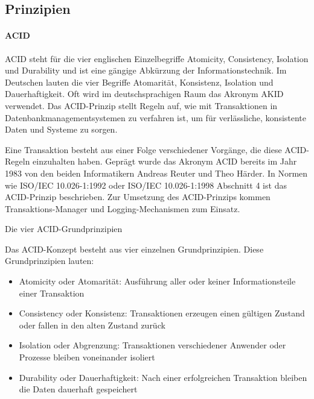 \subsection{Prinzipien}
\label{sec:DBPrinzipien}

\paragraph{ACID}
ACID steht für die vier englischen Einzelbegriffe Atomicity, Consistency, Isolation und Durability und ist eine gängige Abkürzung der Informationstechnik. Im Deutschen lauten die vier Begriffe Atomarität, Konsistenz, Isolation und Dauerhaftigkeit. Oft wird im deutschsprachigen Raum das Akronym AKID verwendet. Das ACID-Prinzip stellt Regeln auf, wie mit Transaktionen in Datenbankmanagementsystemen zu verfahren ist, um für verlässliche, konsistente Daten und Systeme zu sorgen.

Eine Transaktion besteht aus einer Folge verschiedener Vorgänge, die diese ACID-Regeln einzuhalten haben. Geprägt wurde das Akronym ACID bereits im Jahr 1983 von den beiden Informatikern Andreas Reuter und Theo Härder. In Normen wie ISO/IEC 10.026-1:1992 oder ISO/IEC 10.026-1:1998 Abschnitt 4 ist das ACID-Prinzip beschrieben. Zur Umsetzung des ACID-Prinzips kommen Transaktions-Manager und Logging-Mechanismen zum Einsatz.

Die vier ACID-Grundprinzipien

Das ACID-Konzept besteht aus vier einzelnen Grundprinzipien. Diese Grundprinzipien lauten:
\begin{itemize}
	\item Atomicity oder Atomarität: Ausführung aller oder keiner Informationsteile einer Transaktion
	\item Consistency oder Konsistenz: Transaktionen erzeugen einen gültigen Zustand oder fallen in den alten Zustand zurück
	\item Isolation oder Abgrenzung: Transaktionen verschiedener Anwender oder Prozesse bleiben voneinander isoliert
	\item Durability oder Dauerhaftigkeit: Nach einer erfolgreichen Transaktion bleiben die Daten dauerhaft gespeichert
\end{itemize}
\clearpage
